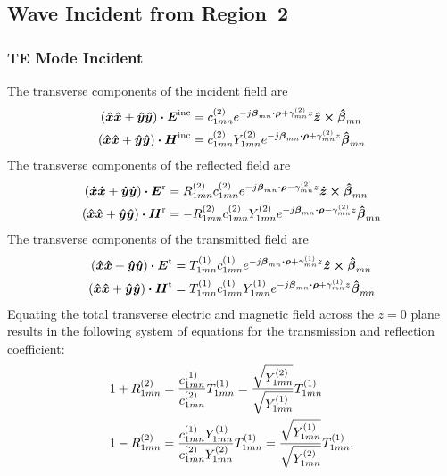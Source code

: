 \subsection{Wave Incident from Region~2}
\label{sec:2inc}
\subsubsection{TE Mode Incident}
The transverse components of the incident field are
\begin{subequations}
  \begin{align}
    (\x\x + \y\y) \bdot \E\inc &= c\two_{1mn}
    e^{-j\vecbeta_{mn}\bdot\vecrho + \gamma\two_{mn} z} 
    \z\cross\betahat_{mn} \\
    (\x\x + \y\y) \bdot \H\inc &= c\two_{1mn} Y\two_{1mn}
    e^{-j\vecbeta_{mn}\bdot\vecrho + \gamma\two_{mn} z} 
    \betahat_{mn}
  \end{align}
\end{subequations}
The transverse components of the reflected field are
\begin{subequations}
  \begin{align}
    (\x\x + \y\y) \bdot \E\refl &= R\two_{1mn} c\two_{1mn}
    e^{-j\vecbeta_{mn}\bdot\vecrho - \gamma\two_{mn} z} 
    \z\cross\betahat_{mn} \\
    (\x\x + \y\y) \bdot \H\refl &= -R\two_{1mn} c\two_{1mn} Y\two_{1mn}
    e^{-j\vecbeta_{mn}\bdot\vecrho - \gamma\two_{mn} z} 
    \betahat_{mn}
  \end{align}
\end{subequations}
The transverse components of the transmitted field are
\begin{subequations}
  \begin{align}
    (\x\x + \y\y) \bdot \E\trans &= T\one_{1mn} c\one_{1mn}
    e^{-j\vecbeta_{mn}\bdot\vecrho + \gamma\one_{mn} z} 
    \z\cross\betahat_{mn} \\
    (\x\x + \y\y) \bdot \H\trans &= T\one_{1mn} c\one_{1mn} Y\one_{1mn}
    e^{-j\vecbeta_{mn}\bdot\vecrho + \gamma\one_{mn} z} 
    \betahat_{mn}
  \end{align}
\end{subequations}
Equating the total transverse electric and magnetic field across the
$z=0$ plane results in the following system of equations for the transmission
and reflection coefficient:
\begin{subequations}
  \label{eq:RTsystem2}
  \begin{align}
    1 + R\two_{1mn} &= \frac{c\one_{1mn}}{c\two_{1mn}} T\one_{1mn} = 
    \frac{\sqrt{Y\two_{1mn}}}{\sqrt{Y\one_{1mn}}} T\one_{1mn} 
    \\
    1 - R\two_{1mn} &= \frac{c\one_{1mn} Y\one_{1mn}}{c\two_{1mn} Y\two_{1mn}}
    T\one_{1mn} = 
    \frac{\sqrt{Y\one_{1mn}}}{\sqrt{Y\two_{1mn}}} T\one_{1mn}.
  \end{align}
\end{subequations}
